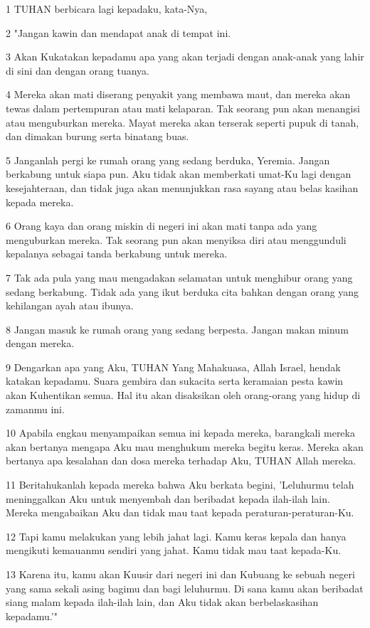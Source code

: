 \par 1 TUHAN berbicara lagi kepadaku, kata-Nya,
\par 2 "Jangan kawin dan mendapat anak di tempat ini.
\par 3 Akan Kukatakan kepadamu apa yang akan terjadi dengan anak-anak yang lahir di sini dan dengan orang tuanya.
\par 4 Mereka akan mati diserang penyakit yang membawa maut, dan mereka akan tewas dalam pertempuran atau mati kelaparan. Tak seorang pun akan menangisi atau menguburkan mereka. Mayat mereka akan terserak seperti pupuk di tanah, dan dimakan burung serta binatang buas.
\par 5 Janganlah pergi ke rumah orang yang sedang berduka, Yeremia. Jangan berkabung untuk siapa pun. Aku tidak akan memberkati umat-Ku lagi dengan kesejahteraan, dan tidak juga akan menunjukkan rasa sayang atau belas kasihan kepada mereka.
\par 6 Orang kaya dan orang miskin di negeri ini akan mati tanpa ada yang menguburkan mereka. Tak seorang pun akan menyiksa diri atau menggunduli kepalanya sebagai tanda berkabung untuk mereka.
\par 7 Tak ada pula yang mau mengadakan selamatan untuk menghibur orang yang sedang berkabung. Tidak ada yang ikut berduka cita bahkan dengan orang yang kehilangan ayah atau ibunya.
\par 8 Jangan masuk ke rumah orang yang sedang berpesta. Jangan makan minum dengan mereka.
\par 9 Dengarkan apa yang Aku, TUHAN Yang Mahakuasa, Allah Israel, hendak katakan kepadamu. Suara gembira dan sukacita serta keramaian pesta kawin akan Kuhentikan semua. Hal itu akan disaksikan oleh orang-orang yang hidup di zamanmu ini.
\par 10 Apabila engkau menyampaikan semua ini kepada mereka, barangkali mereka akan bertanya mengapa Aku mau menghukum mereka begitu keras. Mereka akan bertanya apa kesalahan dan dosa mereka terhadap Aku, TUHAN Allah mereka.
\par 11 Beritahukanlah kepada mereka bahwa Aku berkata begini, 'Leluhurmu telah meninggalkan Aku untuk menyembah dan beribadat kepada ilah-ilah lain. Mereka mengabaikan Aku dan tidak mau taat kepada peraturan-peraturan-Ku.
\par 12 Tapi kamu melakukan yang lebih jahat lagi. Kamu keras kepala dan hanya mengikuti kemauanmu sendiri yang jahat. Kamu tidak mau taat kepada-Ku.
\par 13 Karena itu, kamu akan Kuusir dari negeri ini dan Kubuang ke sebuah negeri yang sama sekali asing bagimu dan bagi leluhurmu. Di sana kamu akan beribadat siang malam kepada ilah-ilah lain, dan Aku tidak akan berbelaskasihan kepadamu.'"
